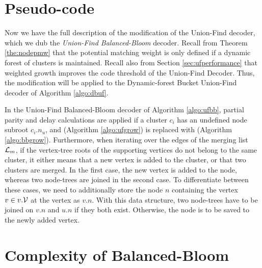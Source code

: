 

\section{Pseudo-code}
Now we have the full description of the modification of the Union-Find decoder, which we dub the \emph{Union-Find Balanced-Bloom} decoder. Recall from Theorem \ref{the:nodepmw} that the potential matching weight is only defined if a dynamic forest of clusters is maintained. Recall also from Section \ref{sec:ufperformance} that weighted growth improves the code threshold of the Union-Find Decoder. Thus, the modification will be applied to the Dynamic-forest Bucket Union-Find decoder of Algorithm \ref{algo:dbuf}. 

In the Union-Find Balanced-Bloom decoder of Algorithm \ref{algo:ufbb}, partial parity and delay calculations are applied if a cluster $c_i$ has an undefined node subroot $c_i.n_u$, and  (Algorithm \ref{algo:ufgrow}) is replaced with  (Algorithm \ref{algo:bbgrow}). Furthermore, when iterating over the edges of the merging list $\mathcal{L}_m$, if the vertex-tree roots of the supporting vertices do not belong to the same cluster, it either means that a new vertex is added to the cluster, or that two clusters are merged. In the first case, the new vertex is added to the node, whereas two node-trees are joined in the second case. To differentiate between these cases, we need to additionally store the node $n$ containing the vertex $v\in v.\mathcal{V}$ at the vertex as $v.n$. With this data structure, two node-trees have to be joined on $v.n$ and $u.n$ if they both exist. Otherwise, the node is to be saved to the newly added vertex. 



\section{Complexity of Balanced-Bloom}\label{sec:ufbbcomplexity}

